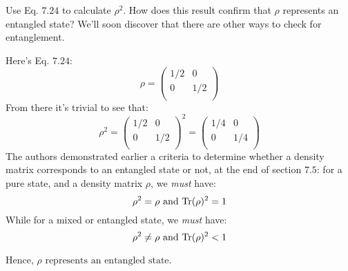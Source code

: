 \documentclass[solutions.tex]{subfiles}
\begin{document}
\maketitle
\begin{exercise} Use Eq. $7.24$ to calculate $\rho^2$. How does this
result confirm that $\rho$ represents an entangled state? We'll soon discover
that there are other ways to check for entanglement.
\end{exercise}
Here's Eq. $7.24$:
\[
	\rho = \begin{pmatrix}
		1/2 & 0   \\
		0   & 1/2 \\
	\end{pmatrix}
\]
From there it's trivial to see that:
\[
	\rho^2 = \begin{pmatrix}
		1/2 & 0   \\
		0   & 1/2 \\
	\end{pmatrix}^2 = \begin{pmatrix}
		1/4 & 0   \\
		0   & 1/4 \\
	\end{pmatrix}
\]
The authors demonstrated earlier a criteria to determine whether a density
matrix corresponds to an entangled state or not, at the end of section
$7.5$: for a pure state, and a density matrix $\rho$, we \textit{must} have:
\[
	\rho^2 = \rho \text{ and } \text{Tr}(\rho)^2 = 1
\]
While for a mixed or entangled state, we \textit{must} have:
\[
	\rho^2 \neq \rho \text{ and } \text{Tr}(\rho)^2 < 1
\]

Hence, $\boxed{\text{$\rho$ represents an entangled state}}$.
\end{document}
